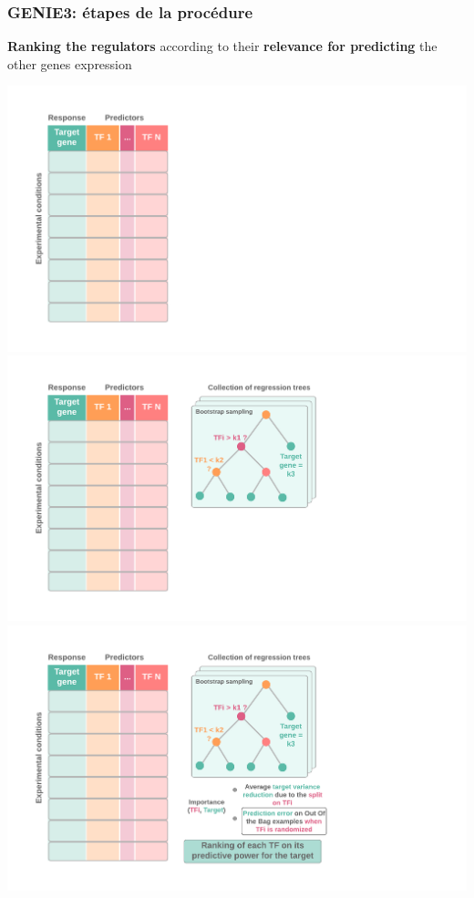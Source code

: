 \begin{frame}
    \frametitle{GENIE3: étapes de la procédure}
    \small \textbf{Ranking the regulators} according to their \textbf{relevance for predicting} the other genes expression
    \vspace{-0.2cm}
    \begin{center}
        \begin{overprint}
        \includegraphics[scale = 0.38]{Figures/Regression/rf1.png}
        \includegraphics[scale = 0.38]{Figures/Regression/rf2.png}
        \includegraphics[scale = 0.38]{Figures/Regression/rf3.png}

\end{overprint}
\end{center}
\end{frame}
